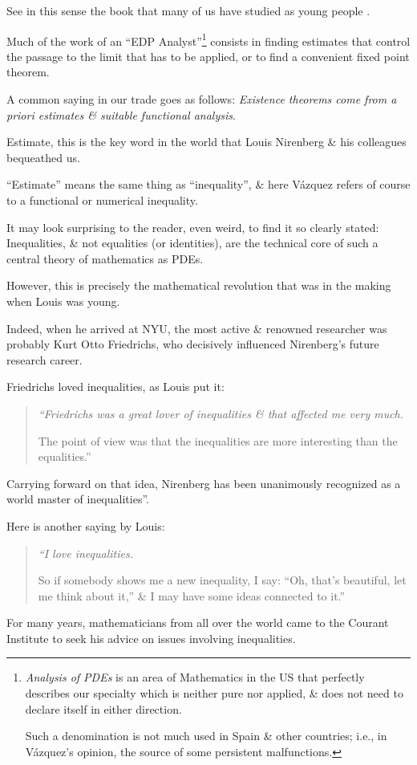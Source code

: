\documentclass{article}
\begin{document}
See in this sense the book that many of us have studied as young people \cite{Brezis2011}.

%
Much of the work of an ``EDP Analyst''\footnote{\textit{Analysis of PDEs} is an area of Mathematics in the US that perfectly describes our specialty which is neither pure nor applied, \& does not need to declare itself in either direction.
	
	Such a denomination is not much used in Spain \& other countries; i.e., in V\'azquez's opinion, the source of some persistent malfunctions.} consists in finding estimates that control the passage to the limit that has to be applied, or to find a convenient fixed point theorem.

A common saying in our trade goes as follows: \textit{Existence theorems come from a priori estimates \& suitable functional analysis}.

Estimate, this is the key word in the world that Louis Nirenberg \& his colleagues bequeathed us.

``Estimate'' means the same thing as ``inequality'', \& here V\'azquez refers of course to a functional or numerical inequality.

%
It may look surprising to the reader, even weird, to find it so clearly stated: Inequalities, \& not equalities (or identities), are the technical core of such a central theory of mathematics as PDEs.

However, this is precisely the mathematical revolution that was in the making when Louis was young.

Indeed, when he arrived at NYU, the most active \& renowned researcher was probably Kurt Otto Friedrichs, who decisively influenced Nirenberg's future research career.

Friedrichs loved inequalities, as Louis put it:
\begin{quotation}\it
	``Friedrichs was a great lover of inequalities \& that affected me very much.
	
	The point of view was that the inequalities are more interesting than the equalities.''
\end{quotation}
Carrying forward on that idea, Nirenberg has been unanimously recognized as a world master of inequalities''.

Here is another saying by Louis:
\begin{quotation}\it
	``I love inequalities.
	
	So if somebody shows me a new inequality, I say: ``Oh, that's beautiful, let me think about it,'' \& I may have some ideas connected to it.''
\end{quotation}
For many years, mathematicians from all over the world came to the Courant Institute to seek his advice on issues involving inequalities.
\end{document}
